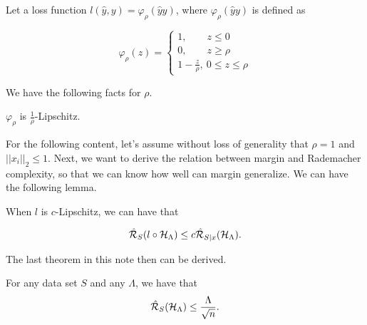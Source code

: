 \documentclass[../main.tex]{subfiles}
\begin{document}
	Let a loss function $l(\hat{y},y) = \varphi_{\rho}(\hat{y}y)$, where $\varphi_{\rho}(\hat{y}y)$ is defined as
	
	\begin{equation*}
	\varphi_{\rho}(z) = 
		\begin{cases*}
			1, \qquad z \leq 0 \\
			0, \qquad z \geq \rho \\
			1 - \frac{z}{\rho}, \ 0 \leq z \leq \rho
		\end{cases*}
	\end{equation*}
	
	We have the following facts for $\rho$.
	
	\begin{fact}
		$\varphi_{\rho}$ is $\frac{1}{\rho}$-Lipschitz.
	\end{fact}

	For the following content, let's assume without loss of generality that $\rho = 1$ and $||x_i||_2 \leq 1$. Next, we want to derive the relation between margin and Rademacher complexity, so that we can know how well can margin generalize. We can have the following lemma.
	
	\begin{lemma}
		When $l$ is $c$-Lipschitz, we can have that
		
		\begin{equation}
			\hat{\mathcal{R}}_S(l\circ \mathcal{H}_{\Lambda}) \leq c \hat{\mathcal{R}}_{S|x}(\mathcal{H}_{\Lambda}).
		\end{equation}
		
	\end{lemma}

	The last theorem in this note then can be derived.
	
	\begin{theorem}
			For any data set $S$ and any $\Lambda$, we have that 
				\begin{equation}
					\hat{\mathcal{R}}_S(\mathcal{H}_{\Lambda}) \leq \frac{\Lambda}{\sqrt{n}}.
				\end{equation}
	\end{theorem}
\end{document}

